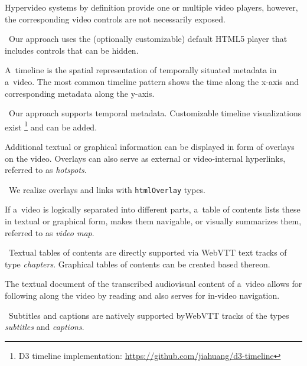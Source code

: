\documentclass{sig-alternate}
\newcommand{\inlinelistingsize}{\fontsize{8pt}{11pt}}
\let\oldurl\url
\renewcommand{\url}[1]{\inlinelistingsize\oldurl{#1}}
\begin{document}
\begin{description}[leftmargin=*]
  \item[Video player and controls] Hypervideo systems by definition
  provide one or multiple video players, however,
  the corresponding video controls are not necessarily exposed.

  \checkmark~Our approach uses the (optionally customizable)
  default HTML5 player that includes controls that can be hidden.

  \item[Timeline] A~timeline is the spatial representation
  of temporally situated metadata in a~video.
  The most common timeline pattern shows the
  time along the x-axis and corresponding metadata along the y-axis.
  
  \checkmark~Our approach supports temporal metadata.
  Customizable timeline visualizations exist%
  \footnote{D3 timeline implementation:
  \url{https://github.com/jiahuang/d3-timeline}}
  and can be added.

  \item[Textual or graphical overlay]
  Additional textual or gra\-phical
  information can be displayed in form of overlays on the video.
  Overlays can also serve as external or video-internal hyperlinks,
  referred to as \emph{hotspots}.

  \checkmark~We realize overlays and links
  with \texttt{htmlOverlay} types.

  \item[Textual or graphical table of contents]
  If a~video is logically separated
  into different parts, a~table of contents lists these
  in textual or graphical form, makes them navigable,
  or visually summarizes them, referred to as \emph{video map}.
  
  \checkmark~Textual tables of contents are directly supported
  via WebVTT text tracks of type \emph{chapters}.
  Graphical tables of contents can be created based thereon.  

  \item[Transcript] The textual document
  of the transcribed audiovisual content of a~video
  allows for following along the video by reading
  and also serves for in-video navigation.
  
  \checkmark~Subtitles and captions are natively supported
  by\linebreak WebVTT tracks of the types \emph{subtitles} and \emph{captions}.
\end{description}
\end{document}
